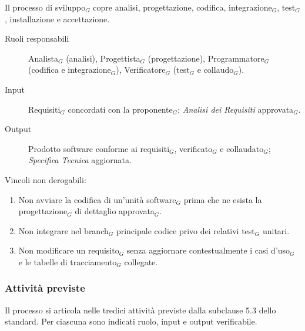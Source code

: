 \documentclass[a4paper, 10pt]{article}
\begin{document}
Il processo di sviluppo$_G$ copre analisi, progettazione, codifica, integrazione$_G$, test$_G$, installazione e accettazione.

\begin{description}
    \item[Ruoli responsabili] Analista$_G$ (analisi), Progettista$_G$ (progettazione), Programmatore$_G$ (codifica e integrazione$_G$), Verificatore$_G$ (test$_G$ e collaudo$_G$).
    \item[Input] Requisiti$_G$ concordati con la proponente$_G$; \textit{Analisi dei Requisiti} approvata$_G$.
    \item[Output] Prodotto software conforme ai requisiti$_G$, verificato$_G$ e collaudato$_G$; \textit{Specifica Tecnica} aggiornata.
\end{description}

\noindent Vincoli non derogabili:
\begin{enumerate}
    \item Non avviare la codifica di un'unità software$_G$ prima che ne esista la progettazione$_G$ di dettaglio approvata$_G$.
    \item Non integrare nel branch$_G$ principale codice privo dei relativi test$_G$ unitari.
    \item Non modificare un requisito$_G$ senza aggiornare contestualmente i casi d'uso$_G$ e le tabelle di tracciamento$_G$ collegate.
\end{enumerate}

\subsubsection{Attività previste}

Il processo si articola nelle tredici attività previste dalla subclause 5.3 dello standard. Per ciascuna sono indicati ruolo, input e output verificabile.
\end{document}
